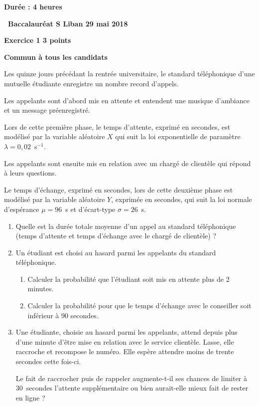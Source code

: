 \documentclass[10pt,a4paper]{article}
\begin{document}
\label{Liban}
\pagestyle{fancy}
\thispagestyle{empty}
\begin{center}
\textbf{Durée : 4 heures }

\vspace{0.5cm}

{\Large \textbf{\decofourleft~Baccalauréat S Liban
29 mai 2018~\decofourright}}
\end{center}

\vspace{0.5cm}

\textbf{Exercice 1 \hfill  3 points}

\textbf{Commun à  tous les candidats}

\medskip

Les quinze jours précédant la rentrée universitaire, le standard téléphonique d'une mutuelle étudiante
enregistre un nombre record d'appels.

Les appelants sont d'abord mis en attente et entendent une musique d'ambiance et un message
préenregistré.

Lors de cette première phase, le temps d'attente, exprimé en secondes, est modélisé par la variable
aléatoire $X$ qui suit la loi exponentielle de paramètre $\lambda = 0,02$~s$^{-1}$.

Les appelants sont ensuite mis en relation avec un chargé de clientèle qui répond à leurs questions.

Le temps d'échange, exprimé en secondes, lors de cette deuxième phase est modélisé par la
variable aléatoire $Y$, exprimée en secondes, qui suit la loi normale d'espérance $\mu = 96$~s et d'écart-type $\sigma = 26$~s.

\medskip

\begin{enumerate}
\item Quelle est la durée totale moyenne d'un appel au standard téléphonique (temps d'attente et
temps d'échange avec le chargé de clientèle) ?
\item  Un étudiant est choisi au hasard parmi les appelants du standard téléphonique.
	\begin{enumerate}
		\item Calculer la probabilité que l'étudiant soit mis en attente plus de 2 minutes.
		\item Calculer la probabilité pour que le temps d'échange avec le conseiller soit inférieur à 90
secondes.
 	\end{enumerate}
\item  Une étudiante, choisie au hasard parmi les appelants, attend depuis plus d'une minute d'être
mise en relation avec le service clientèle. Lasse, elle raccroche et recompose le numéro. Elle
espère attendre moins de trente secondes cette fois-ci.
	
Le fait de raccrocher puis de rappeler augmente-t-il ses chances de limiter à $30$~secondes
l'attente supplémentaire ou bien aurait-elle mieux fait de rester en ligne ?
\end{enumerate}
\end{document}
